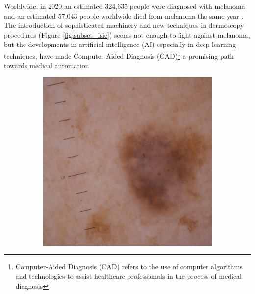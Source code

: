 Worldwide, in 2020 an estimated 324,635 people were diagnosed with melanoma and
an estimated 57,043 people worldwide died from melanoma the same year
\cite{CancerStats}. The introduction of sophisticated machinery and new
techniques in dermoscopy procedures (Figure \ref{fig:subset_isic}) seems not
enough to fight against melanoma, but the developments in artificial
intelligence (AI) especially in deep learning techniques, have made
Computer-Aided Diagnosis (CAD)\footnote{Computer-Aided Diagnosis (CAD) refers
to the use of computer algorithms and technologies to assist healthcare
professionals in the process of medical diagnosis} a promising path towards
medical automation.

\begin{figure}[H] \centering
  \begin{subfigure}{0.3\textwidth}
    \includegraphics[width=\textwidth]{imatges/introduction/subset_isic/ISIC_1752943.jpg}
  \end{subfigure}
  \hfill
  \begin{subfigure}{0.3\textwidth}

\end{subfigure}
\end{figure}
